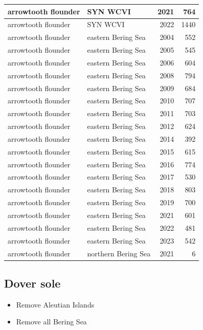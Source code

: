 \documentclass[
  letterpaper,
  DIV=11,
  numbers=noendperiod]{scrartcl}
\providecommand{\tightlist}{%
  \setlength{\itemsep}{0pt}\setlength{\parskip}{0pt}}\usepackage{longtable,booktabs,array}
\begin{document}
\begin{tabular}[t]{l|l|r|r}
\hline
arrowtooth flounder & SYN WCVI & 2021 & 764\\
\hline
arrowtooth flounder & SYN WCVI & 2022 & 1440\\
\hline
arrowtooth flounder & eastern Bering Sea & 2004 & 552\\
\hline
arrowtooth flounder & eastern Bering Sea & 2005 & 545\\
\hline
arrowtooth flounder & eastern Bering Sea & 2006 & 604\\
\hline
arrowtooth flounder & eastern Bering Sea & 2008 & 794\\
\hline
arrowtooth flounder & eastern Bering Sea & 2009 & 684\\
\hline
arrowtooth flounder & eastern Bering Sea & 2010 & 707\\
\hline
arrowtooth flounder & eastern Bering Sea & 2011 & 703\\
\hline
arrowtooth flounder & eastern Bering Sea & 2012 & 624\\
\hline
arrowtooth flounder & eastern Bering Sea & 2014 & 392\\
\hline
arrowtooth flounder & eastern Bering Sea & 2015 & 615\\
\hline
arrowtooth flounder & eastern Bering Sea & 2016 & 774\\
\hline
arrowtooth flounder & eastern Bering Sea & 2017 & 530\\
\hline
arrowtooth flounder & eastern Bering Sea & 2018 & 803\\
\hline
arrowtooth flounder & eastern Bering Sea & 2019 & 700\\
\hline
arrowtooth flounder & eastern Bering Sea & 2021 & 601\\
\hline
arrowtooth flounder & eastern Bering Sea & 2022 & 481\\
\hline
arrowtooth flounder & eastern Bering Sea & 2023 & 542\\
\hline
arrowtooth flounder & northern Bering Sea & 2021 & 6\\
\hline
\end{tabular}

\subsection{Dover sole}\label{dover-sole}

\begin{itemize}
\tightlist
\item
  Remove Aleutian Islands
\item
  Remove all Bering Sea
\end{itemize}
\end{document}
